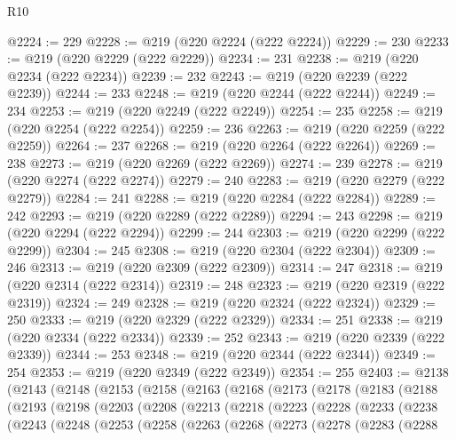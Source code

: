 \begin{lexlean}{R10}
\begin{coremodule}
{{{{{{{{{{{{{{{{{{{{{{{{{{{{{{{{{{{{{{{{{{{{{{{{{{{{{{{{{{{{{{{{{{{{{{{{{{{{{{{{{{{{{{{{{{{{{{{{{{{{{{{{{{{{@2224 := 229
@2228 := @219 (@220 @2224 (@222 @2224))
@2229 := 230
@2233 := @219 (@220 @2229 (@222 @2229))
@2234 := 231
@2238 := @219 (@220 @2234 (@222 @2234))
@2239 := 232
@2243 := @219 (@220 @2239 (@222 @2239))
@2244 := 233
@2248 := @219 (@220 @2244 (@222 @2244))
@2249 := 234
@2253 := @219 (@220 @2249 (@222 @2249))
@2254 := 235
@2258 := @219 (@220 @2254 (@222 @2254))
@2259 := 236
@2263 := @219 (@220 @2259 (@222 @2259))
@2264 := 237
@2268 := @219 (@220 @2264 (@222 @2264))
@2269 := 238
@2273 := @219 (@220 @2269 (@222 @2269))
@2274 := 239
@2278 := @219 (@220 @2274 (@222 @2274))
@2279 := 240
@2283 := @219 (@220 @2279 (@222 @2279))
@2284 := 241
@2288 := @219 (@220 @2284 (@222 @2284))
@2289 := 242
@2293 := @219 (@220 @2289 (@222 @2289))
@2294 := 243
@2298 := @219 (@220 @2294 (@222 @2294))
@2299 := 244
@2303 := @219 (@220 @2299 (@222 @2299))
@2304 := 245
@2308 := @219 (@220 @2304 (@222 @2304))
@2309 := 246
@2313 := @219 (@220 @2309 (@222 @2309))
@2314 := 247
@2318 := @219 (@220 @2314 (@222 @2314))
@2319 := 248
@2323 := @219 (@220 @2319 (@222 @2319))
@2324 := 249
@2328 := @219 (@220 @2324 (@222 @2324))
@2329 := 250
@2333 := @219 (@220 @2329 (@222 @2329))
@2334 := 251
@2338 := @219 (@220 @2334 (@222 @2334))
@2339 := 252
@2343 := @219 (@220 @2339 (@222 @2339))
@2344 := 253
@2348 := @219 (@220 @2344 (@222 @2344))
@2349 := 254
@2353 := @219 (@220 @2349 (@222 @2349))
@2354 := 255
@2403 := @2138
    (@2143
      (@2148
        (@2153
          (@2158
            (@2163
              (@2168
                (@2173
                  (@2178
                    (@2183
                      (@2188
                        (@2193
                          (@2198
                            (@2203
                              (@2208
                                (@2213
                                  (@2218
                                    (@2223
                                      (@2228
                                        (@2233
                                          (@2238
                                            (@2243
                                              (@2248
                                                (@2253
                                                  (@2258
                                                    (@2263
                                                      (@2268
                                                        (@2273
                                                          (@2278
                                                            (@2283
                                                              (@2288
}}}}}}}}}}}}}}}}}}}}}}}}}}}}}}}}}}}}}}}}}}}}}}}}}}}}}}}}}}}}}}}}}}}}}}}}}}}}}}}}}}}}}}}}}}}}}}}}}}}}}}}}}}}}
\end{coremodule}
\end{lexlean}
